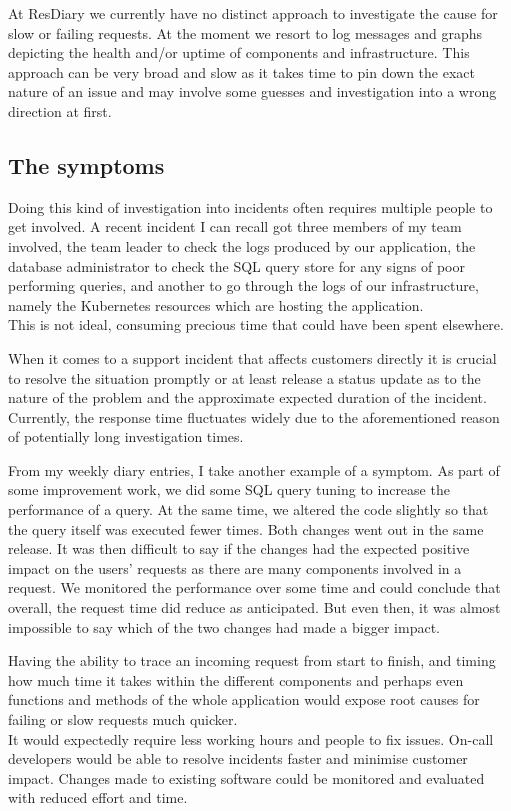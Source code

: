\documentclass[11pt]{article}
\begin{document}
At ResDiary we currently have no distinct approach to investigate the cause for slow or failing requests. At the moment we resort to log messages and graphs depicting the health and/or uptime of components and infrastructure. This approach can be very broad and slow as it takes time to pin down the exact nature of an issue and may involve some guesses and investigation into a wrong direction at first. 

\subsection{The symptoms}

Doing this kind of investigation into incidents often requires multiple people to get involved. A recent incident I can recall got three members of my team involved, the team leader to check the logs produced by our application, the database administrator to check the SQL query store for any signs of poor performing queries, and another to go through the logs of our infrastructure, namely the Kubernetes resources which are hosting the application.\\
This is not ideal, consuming precious time that could have been spent elsewhere.

When it comes to a support incident that affects customers directly it is crucial to resolve the situation promptly or at least release a status update as to the nature of the problem and the approximate expected duration of the incident. Currently, the response time fluctuates widely due to the aforementioned reason of potentially long investigation times.

From my weekly diary entries, I take another example of a symptom. As part of some improvement work, we did some SQL query tuning to increase the performance of a query. At the same time, we altered the code slightly so that the query itself was executed fewer times. Both changes went out in the same release. It was then difficult to say if the changes had the expected positive impact on the users' requests as there are many components involved in a request. We monitored the performance over some time and could conclude that overall, the request time did reduce as anticipated. But even then, it was almost impossible to say which of the two changes had made a bigger impact.

Having the ability to trace an incoming request from start to finish, and timing how much time it takes within the different components and perhaps even functions and methods of the whole application would expose root causes for failing or slow requests much quicker.\\
It would expectedly require less working hours and people to fix issues. On-call developers would be able to resolve incidents faster and minimise customer impact. Changes made to existing software could be monitored and evaluated with reduced effort and time.
\end{document}
